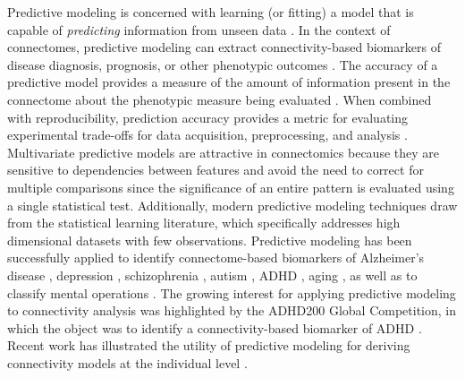 \documentclass[5p]{elsarticle}
\begin{document}



Predictive modeling is concerned with learning (or fitting) a model that is
capable of \emph{predicting} information from unseen data
\cite{pereira2009}.  In the context of connectomes, predictive modeling
can extract connectivity-based biomarkers of disease diagnosis,
prognosis, or other phenotypic outcomes \cite{craddock2009, dosenbach2010}. The
accuracy of a predictive model provides a measure of the amount of information
present in the connectome about the phenotypic measure being evaluated
\cite{kjems2002, kriegeskorte2006}.  When combined with reproducibility, prediction accuracy
provides a metric for evaluating experimental trade-offs for data acquisition,
preprocessing, and analysis \cite{strother2002, laconte2003}.  Multivariate
predictive models are attractive in connectomics because they are sensitive to dependencies
between features and avoid the need to correct for multiple comparisons since
the significance of an entire pattern is evaluated using a single statistical
test. 
Additionally, modern predictive modeling techniques draw from the
statistical learning literature, which specifically addresses
 high dimensional datasets with few observations.
Predictive modeling has been
successfully applied to identify connectome-based biomarkers of Alzheimer's
disease \cite{stonnington2010}, depression \cite{craddock2009, zeng2012}, schizophrenia
\cite{cecchi2009, shen2010}, autism \cite{anderson2011}, ADHD \cite{zhu2008}, aging
\cite{dosenbach2010}, as well as to classify mental operations
\cite{richiardi2011,shirer2012}. The growing interest for applying
predictive modeling to connectivity analysis was highlighted by the ADHD200
Global Competition, in which the object was to identify a connectivity-based
biomarker of ADHD \cite{adhd2002012}. Recent work has illustrated the utility
of predictive modeling for deriving connectivity models at the individual level
\cite{chu2011}.
\end{document}
